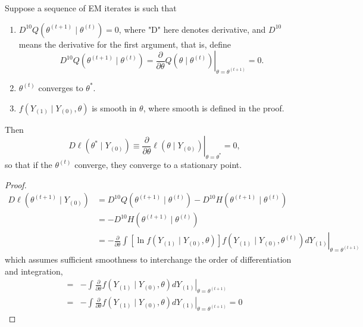\begin{theorem}
	Suppose a sequence of EM iterates is such that
	\begin{enumerate}
		\item $D^{10} Q\left(\theta^{(t+1)} \mid \theta^{(t)}\right)=0$, where "D" here denotes derivative, and $D^{10}$ means the derivative for the first argument, that is, define
		      \begin{equation}
			      D^{10} Q\left(\theta^{(t+1)}\mid\theta^{(t)}\right)=\left.\frac{\partial}{\partial \theta} Q\left(\theta \mid \theta^{(t)}\right)\right|_{\theta=\theta^{(t+1)}}=0.
		      \end{equation}
		\item $\theta^{(t)}$ converges to $\theta^{*}$.
		\item $f\left(Y_{(1)} \mid Y_{(0)}, \theta\right)$ is smooth in $\theta$, where smooth is defined in the proof.
	\end{enumerate}
	Then
	\begin{equation}
		\left.D \ell\left(\theta^{*} \mid Y_{(0)}\right) \equiv \frac{\partial}{\partial \theta} \ell\left(\theta \mid Y_{(0)}\right)\right|_{\theta=\theta^{*}}=0,
	\end{equation}
	so that if the $\theta^{(t)}$ converge, they converge to a stationary point.
\end{theorem}

\begin{proof}
	\begin{equation}
		\begin{aligned}
			D \ell\left(\theta^{(t+1)} \mid Y_{(0)}\right) & =D^{10} Q\left(\theta^{(t+1)} \mid \theta^{(t)}\right)-D^{10} H\left(\theta^{(t+1)} \mid \theta^{(t)}\right)                                                                                       \\
			                                               & =-D^{10} H\left(\theta^{(t+1)} \mid \theta^{(t)}\right)                                                                                                                                            \\
			                                               & =-\left.\frac{\partial}{\partial \theta} \int\left[\ln f\left(Y_{(1)} \mid Y_{(0)}, \theta\right)\right] f\left(Y_{(1)} \mid Y_{(0)}, \theta^{(t)}\right) d Y_{(1)}\right|_{\theta=\theta^{(t+1)}}
		\end{aligned}
	\end{equation}
	which assumes sufficient smoothness to interchange the order of differentiation and integration,
	\begin{equation}
		\begin{aligned}
			= & -\int\left.\frac{\partial}{\partial \theta} f\left(Y_{(1)} \mid Y_{(0)}, \theta\right) d Y_{(1)}\right|_{\theta=\theta^{(t+1)}}    \\
			= & -\left.\int \frac{\partial}{\partial \theta} f\left(Y_{(1)} \mid Y_{(0)}, \theta\right) d Y_{(1)}\right|_{\theta=\theta^{(t+1)}}=0
		\end{aligned}
	\end{equation}
\end{proof}

